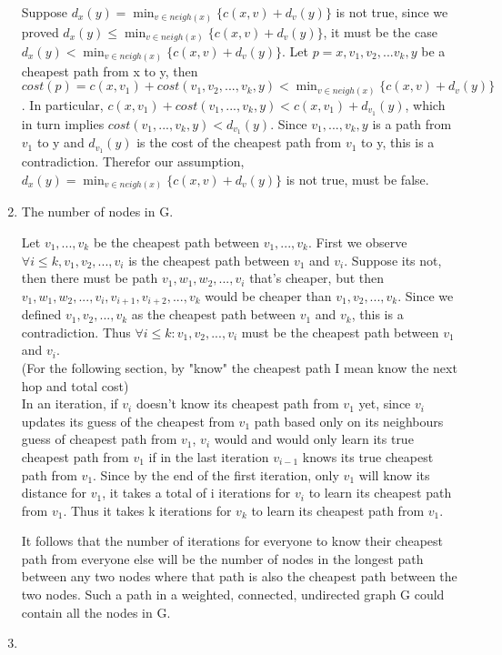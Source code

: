\documentclass[12pt]{article}
\begin{document}
\begin{enumerate}
        Suppose $d_x(y) = \min_{v \in neigh(x)}\{c(x,v) + d_v(y)\}$ is not true, since we proved
        $d_x(y) \leq \min_{v \in neigh(x)}\{c(x,v) + d_v(y)\}$, it must be the case 
        $d_x(y) < \min_{v \in neigh(x)}\{c(x,v) + d_v(y)\}$.
        Let $p=x,v_1,v_2,...v_k,y$ be a cheapest path from x to y, then  
        $cost(p) = c(x,v_1) + cost(v_1, v_2,...,v_k,y) < \min_{v \in neigh(x)}\{c(x,v) + d_v(y)\}$. 
        In particular, $c(x, v_1) + cost(v_1,...,v_k,y) < c(x, v_1) + d_{v_1}(y)$,
        which in turn implies $cost(v_1,...,v_k,y) < d_{v_1}(y)$.
        Since $v_1,...,v_k,y$ is a path from $v_1$ to y and $d_{v_1}(y)$ is the cost of the cheapest path from 
        $v_1$ to y, this is a contradiction. Therefor our assumption, $d_x(y) = \min_{v \in neigh(x)}\{c(x,v) + d_v(y)\}$ is not true,
        must be false.

	\item %

        The number of nodes in G.

        Let $v_1,...,v_k$ be the cheapest path between $v_1,...,v_k$.  First we observe
        $\forall i \leq k, v_1, v_2, ..., v_i$ is the cheapest path between $v_1$ and $v_i$.
        Suppose its not, then there must be path $v_1,w_1,w_2,...,v_i$ that's cheaper, but then
        $v_1,w_1,w_2,...,v_i,v_{i+1},v_{i+2},...,v_k$ would be cheaper than $v_1,v_2,...,v_k$.
        Since we defined $v_1,v_2,...,v_k$ as the cheapest path between $v_1$ and $v_k$, this is a
        contradiction. Thus $\forall i \leq k: v_1, v_2, ..., v_i$ must be the cheapest path between $v_1$ and $v_i$. \\

        (For the following section, by "know" the cheapest path I mean know the next hop and total cost) \\

        In an iteration, if $v_i$ doesn't know its cheapest path from $v_1$ yet, since $v_i$ updates its guess of the cheapest
        from $v_1$ path based only on its neighbours guess of cheapest path from $v_1$,
        $v_i$ would and would only learn its true cheapest path from $v_1$ if in the last 
        iteration $v_{i-1}$ knows its true cheapest path from $v_1$. Since by the end of the first iteration, only
        $v_1$ will know its distance for $v_1$, it takes a total of i iterations for $v_i$ to learn
        its cheapest path from $v_1$. Thus it takes k iterations for $v_k$ to learn its cheapest path
        from $v_1$.

        It follows that the number of iterations for everyone to know their cheapest path from everyone else 
        will be the number of nodes in the longest path between any two nodes where that path is also the 
        cheapest path between the two nodes. Such a path in a weighted, connected, undirected graph G
        could contain all the nodes in G.



	\item %
	

\end{enumerate}
\end{document}
